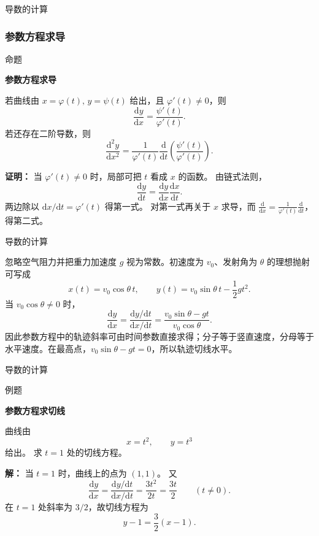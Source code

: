 \documentclass[aspectratio=169,10pt,fontset=fandol]{ctexbeamer}
\newcommand{\dd}{\mathrm{d}}
\begin{document}
\begin{frame}[t,fragile]{导数的计算}
\normalsize
{\normalsize
\subsubsection*{参数方程求导}


}
\begin{block}{命题}
{\normalsize
\textbf{参数方程求导}\par

若曲线由 $x=\varphi(t),\,y=\psi(t)$ 给出，且 $\varphi'(t)\neq0$，则
\[
\frac{\dd y}{\dd x}=\frac{\psi'(t)}{\varphi'(t)}.
\]
若还存在二阶导数，则
\[
\frac{\dd^2y}{\dd x^2}
=\frac{1}{\varphi'(t)}\frac{\dd}{\dd t}\left(\frac{\psi'(t)}{\varphi'(t)}\right).
\]

}
\end{block}
\pause
{\normalsize
\textbf{证明：}
当 $\varphi'(t)\neq0$ 时，局部可把 $t$ 看成 $x$ 的函数。 由链式法则，
\[
\frac{\dd y}{\dd t}=\frac{\dd y}{\dd x}\frac{\dd x}{\dd t}.
\]
两边除以 $\dd x/\dd t=\varphi'(t)$ 得第一式。 对第一式再关于 $x$ 求导，而 $\frac{\dd}{\dd x}=\frac1{\varphi'(t)}\frac{\dd}{\dd t}$，得第二式。

}
\end{frame}
\begin{frame}[t,fragile]{导数的计算}
\normalsize
{\normalsize
\begin{application}
忽略空气阻力并把重力加速度 $g$ 视为常数。初速度为 $v_0$、发射角为 $\theta$ 的理想抛射可写成
\[
x(t)=v_0\cos\theta\,t,\qquad
y(t)=v_0\sin\theta\,t-\frac12gt^2.
\]
当 $v_0\cos\theta\neq0$ 时，
\[
\frac{\dd y}{\dd x}
=\frac{\dd y/\dd t}{\dd x/\dd t}
=\frac{v_0\sin\theta-gt}{v_0\cos\theta}.
\]
因此参数方程中的轨迹斜率可由时间参数直接求得；分子等于竖直速度，分母等于水平速度。在最高点，$v_0\sin\theta-gt=0$，所以轨迹切线水平。
\end{application}
}
\end{frame}
\begin{frame}[t,fragile]{导数的计算}
\normalsize
\begin{block}{例题}
{\normalsize
\textbf{参数方程求切线}\par

曲线由
\[
x=t^2,\qquad y=t^3
\]
给出。 求 $t=1$ 处的切线方程。

}
\end{block}
\pause
{\normalsize
\textbf{解：}
当 $t=1$ 时，曲线上的点为 $(1,1)$。 又
\[
\frac{\dd y}{\dd x}
=\frac{\dd y/\dd t}{\dd x/\dd t}
=\frac{3t^2}{2t}
=\frac{3t}{2}\qquad(t\neq0).
\]
在 $t=1$ 处斜率为 $3/2$，故切线方程为
\[
y-1=\frac32(x-1).
\]

}
\end{frame}
\end{document}
